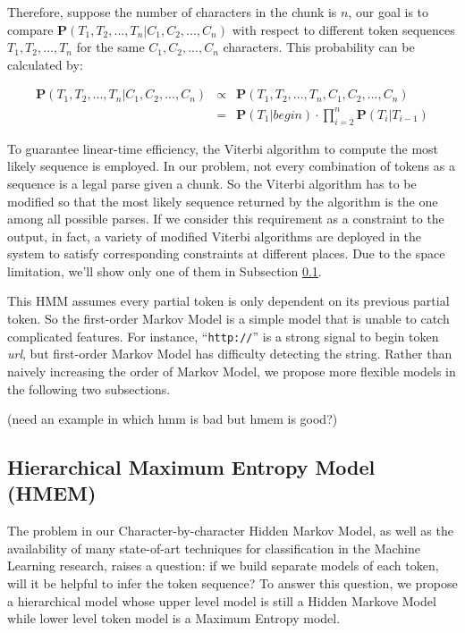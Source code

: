 Therefore, suppose the number of characters in the chunk is $n$, our
goal is to compare $\mathbf{P}(T_1, T_2, ..., T_n|C_1, C_2, ..., C_n)$
with respect to different token sequences $T_1, T_2, ..., T_n$ for the
same $C_1, C_2, ..., C_n$ characters. This probability can be
calculated by:

\begin{eqnarray*}
\mathbf{P}(T_1, T_2, ..., T_n|C_1, C_2, ..., C_n) & \propto & \mathbf{P}(T_1, T_2, ..., T_n, C_1, C_2, ..., C_n)\\
& = & \mathbf{P}(T_1|begin) \cdot
\prod_{i=2}^{n}{\mathbf{P}(T_i|T_{i-1})}
\end{eqnarray*}

To guarantee linear-time efficiency, the Viterbi algorithm to compute
the most likely sequence is employed. In our problem, not every
combination of tokens as a sequence is a legal parse given a chunk. So
the Viterbi algorithm has to be modified so that the most likely sequence
returned by the algorithm is the one among all possible parses. If we
consider this requirement as a constraint to the output, in fact, a
variety of modified Viterbi algorithms are deployed in the
\learnpads{} system to satisfy corresponding constraints at different
places. Due to the space limitation, we'll show only one of them in
Subsection \ref{subsec:hmem}.

This HMM assumes every partial token is only dependent on its previous
partial token. So the first-order Markov Model is a simple model that
is unable to catch
complicated features. For instance, ``{\tt http://}'' is a strong
signal to begin token {\em url}, but first-order Markov Model has
difficulty detecting the string. Rather than naively increasing the
order of Markov Model, we propose more flexible models in the
following two subsections.

(need an example in which hmm is bad but hmem is good?)

\subsection{Hierarchical Maximum Entropy Model (HMEM)}\label{subsec:hmem}

The problem in our Character-by-character Hidden Markov Model, as
well as the availability of many state-of-art techniques for
classification in the Machine Learning research, raises a question:
if we build separate models of each token, will it be helpful to
infer the token sequence? To answer this question, we propose a
hierarchical model whose upper level model is still a Hidden Markove
Model while lower level token model is a Maximum Entropy model.

